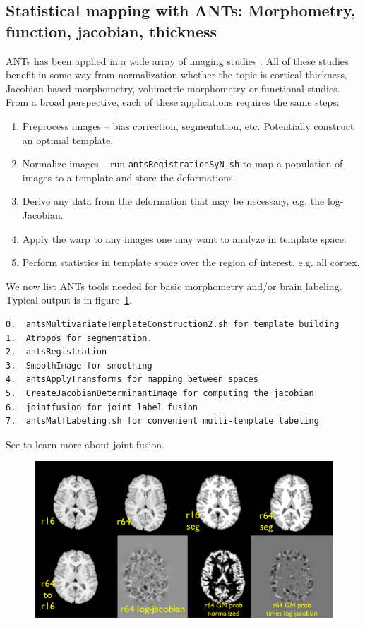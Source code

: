 \documentclass{InsightArticle}
\begin{document}
\subsection{Statistical mapping with ANTs: Morphometry, function, jacobian, thickness}
ANTs has been applied in a wide array of imaging studies
\cite{Avants2009a,Avants2009b,Avants2009,Das2009,Klein2009,Massimo2009,Pluta2008,Tustison2009,Yushkevich2009,Avants2008c,Avants2008b,M.Grossman10282008,Kim2008,Simon2008,Sun2008,Yushkevich2008,Aguirre2007,Avants2007,Avants2007i}.
All of these studies benefit in some way from normalization whether the topic is cortical
thickness, Jacobian-based morphometry, volumetric morphometry or functional studies. 
From a broad perspective, each of these applications requires the same steps:
\begin{enumerate}
\item Preprocess images -- bias correction, segmentation, etc.  Potentially construct an optimal template. 
\item Normalize images -- run \texttt{antsRegistrationSyN.sh} to map a population of images to a template and store the deformations. 
\item Derive any data from the deformation that may be necessary, e.g. the log-Jacobian.
\item Apply the warp to any images one may want to analyze in template space.  
\item Perform statistics in template space over the region of interest, e.g. all cortex. 
\end{enumerate}
We now list ANTs tools needed for basic morphometry and/or brain labeling.
Typical output is in figure~\ref{fig:morph}.
\begin{verbatim}
0.  antsMultivariateTemplateConstruction2.sh for template building
1.  Atropos for segmentation.
2.  antsRegistration
3.  SmoothImage for smoothing  
4.  antsApplyTransforms for mapping between spaces
5.  CreateJacobianDeterminantImage for computing the jacobian
6.  jointfusion for joint label fusion
7.  antsMalfLabeling.sh for convenient multi-template labeling
\end{verbatim}
See \cite{Wang2011} to learn more about joint fusion.
\begin{figure}
\includegraphics[width=1\textwidth]{Figures/morphometry.pdf}
\label{fig:morph}
\end{figure}
\end{document}
